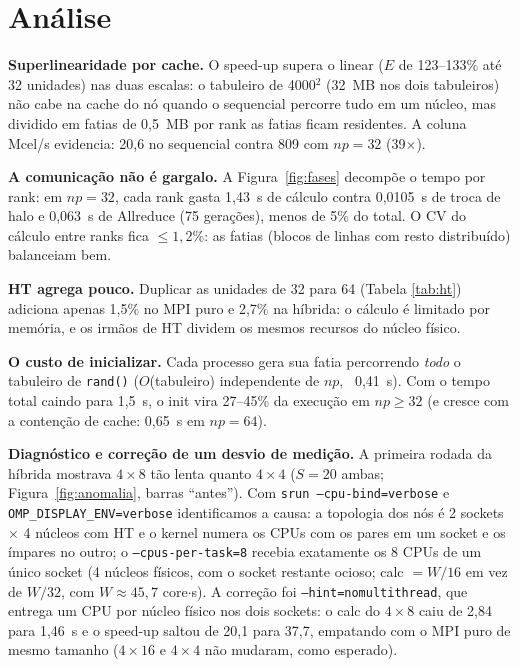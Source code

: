 \documentclass[10pt,twocolumn]{article}
\begin{document}
\section{Análise}
\label{sec:analise}

\textbf{Superlinearidade por cache.} O speed-up supera o linear ($E$ de
123--133\% até 32 unidades) nas duas escalas: o tabuleiro de 4000$^2$
(32~MB nos dois tabuleiros) não cabe na cache do nó quando o sequencial
percorre tudo em um núcleo, mas dividido em fatias de 0,5~MB por rank as
fatias ficam residentes. A coluna Mcel/s evidencia: 20,6 no sequencial
contra 809 com $np=32$ (39$\times$).

\textbf{A comunicação não é gargalo.} A Figura~\ref{fig:fases} decompõe o
tempo por rank: em $np=32$, cada rank gasta 1,43~s de cálculo contra
0,0105~s de troca de halo e 0,063~s de Allreduce (75 gerações), menos de
5\% do total. O CV do cálculo entre ranks fica $\le 1{,}2\%$: as fatias
(blocos de linhas com resto distribuído) balanceiam bem.

\textbf{HT agrega pouco.} Duplicar as unidades de 32 para 64 (Tabela
\ref{tab:ht}) adiciona apenas 1,5\% no MPI puro e 2,7\% na híbrida: o
cálculo é limitado por memória, e os irmãos de HT dividem os mesmos
recursos do núcleo físico.

\textbf{O custo de inicializar.} Cada processo gera sua fatia percorrendo
\emph{todo} o tabuleiro de \texttt{rand()} ($O$(tabuleiro)
independente de $np$, ~0,41~s). Com o tempo total caindo para 1,5~s, o
init vira 27--45\% da execução em $np \ge 32$ (e cresce com a contenção de
cache: 0,65~s em $np=64$).

\textbf{Diagnóstico e correção de um desvio de medição.} A primeira rodada
da híbrida mostrava $4{\times}8$ tão lenta quanto $4{\times}4$ ($S=20$
ambas; Figura~\ref{fig:anomalia}, barras ``antes''). Com
\texttt{srun --cpu-bind=verbose} e \texttt{OMP\_DISPLAY\_ENV=verbose}
identificamos a causa: a topologia dos nós é 2 sockets $\times$ 4 núcleos
com HT e o kernel numera os CPUs com os pares em um socket e os ímpares no
outro; o \texttt{--cpus-per-task=8} recebia exatamente os 8 CPUs de um
único socket (4 núcleos físicos, com o socket restante ocioso; calc
$= W/16$ em vez de $W/32$, com $W \approx 45{,}7$ core$\cdot$s). A correção
foi \texttt{--hint=nomultithread}, que entrega um CPU por núcleo físico nos
dois sockets: o calc do $4{\times}8$ caiu de 2,84 para 1,46~s e o speed-up
saltou de 20,1 para 37,7, empatando com o MPI puro de mesmo tamanho
($4{\times}16$ e $4{\times}4$ não mudaram, como esperado).
\end{document}
